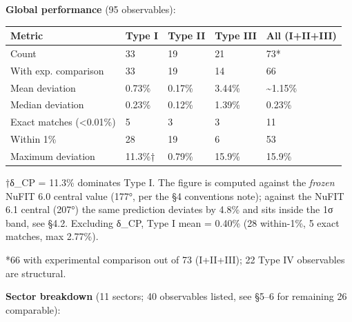 \documentclass[11pt,a4paper]{article}
\begin{document}
\textbf{Global performance} (95 observables):

\begin{longtable}[]{@{}lllll@{}}
\toprule\noalign{}
Metric & Type I & Type II & Type III & All (I+II+III) \\
\midrule\noalign{}
\endhead
\bottomrule\noalign{}
\endlastfoot
Count & 33 & 19 & 21 & 73* \\
With exp. comparison & 33 & 19 & 14 & 66 \\
Mean deviation & 0.73\% & 0.17\% & 3.44\% & \textasciitilde1.15\% \\
Median deviation & 0.23\% & 0.12\% & 1.39\% & 0.23\% \\
Exact matches (\textless0.01\%) & 5 & 3 & 3 & 11 \\
Within 1\% & 28 & 19 & 6 & 53 \\
Maximum deviation & 11.3\%† & 0.79\% & 15.9\% & 15.9\% \\
\end{longtable}

†δ\_\allowbreak{}CP = 11.3\% dominates Type I. The figure is computed against the \emph{frozen} NuFIT 6.0 central value (177°, per the §4 conventions note); against the NuFIT 6.1 central (207°) the same prediction deviates by 4.8\% and sits inside the 1σ band, see §4.2. Excluding δ\_\allowbreak{}CP, Type I mean = 0.40\% (28 within-1\%, 5 exact matches, max 2.77\%).

*66 with experimental comparison out of 73 (I+II+III); 22 Type IV observables are structural.

\textbf{Sector breakdown} (11 sectors; 40 observables listed, see §5--6 for remaining 26 comparable):
\end{document}
